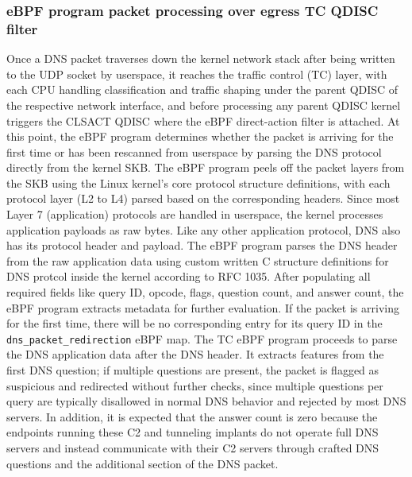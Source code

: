 \documentclass [11pt, proquest] {uwthesis}[2020/02/24]
\begin{document}
\subsubsection{\textbf{eBPF program packet processing over egress TC QDISC filter}}
\label{active:sec1}
\label{sec:alg1}  
Once a DNS packet traverses down the kernel network stack after being written to the UDP socket by userspace, it reaches the traffic control (TC) layer, with each CPU handling classification and traffic shaping under the parent QDISC of the respective network interface, and before processing any parent QDISC kernel triggers the CLSACT QDISC where the eBPF direct-action filter is attached. At this point, the eBPF program determines whether the packet is arriving for the first time or has been rescanned from userspace by parsing the DNS protocol directly from the kernel SKB. The eBPF program peels off the packet layers from the SKB using the Linux kernel’s core protocol structure definitions, with each protocol layer (L2 to L4) parsed based on the corresponding headers. Since most Layer 7 (application) protocols are handled in userspace, the kernel processes application payloads as raw bytes. Like any other application protocol, DNS also has its protocol header and payload. The eBPF program parses the DNS header from the raw application data using custom written C structure definitions for DNS protcol inside the kernel according to RFC 1035. After populating all required fields like query ID, opcode, flags, question count, and answer count, the eBPF program extracts metadata for further evaluation. If the packet is arriving for the first time, there will be no corresponding entry for its query ID in the \texttt{dns\_packet\_redirection} eBPF map. The TC eBPF program proceeds to parse the DNS application data after the DNS header. It extracts features from the first DNS question; if multiple questions are present, the packet is flagged as suspicious and redirected without further checks, since multiple questions per query are typically disallowed in normal DNS behavior and rejected by most DNS servers. In addition, it is expected that the answer count is zero because the endpoints running these C2 and tunneling implants do not operate full DNS servers and instead communicate with their C2 servers through crafted DNS questions and the additional section of the DNS packet.
\end{document}
